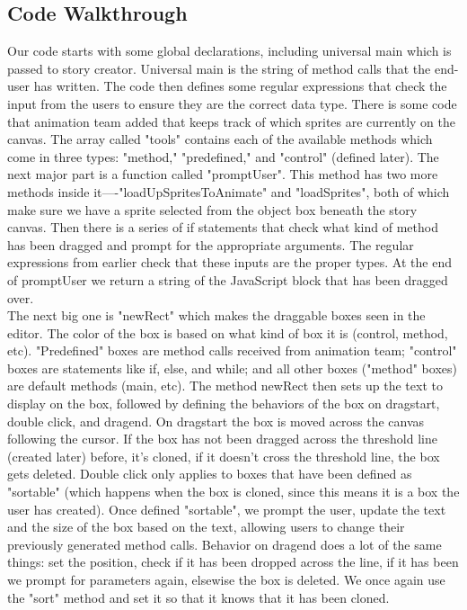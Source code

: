 \documentclass[a4paper]{article}
\begin{document}
\subsection{Code Walkthrough}
Our code starts with some global declarations, including universal main which is passed to story creator. Universal main is the string of method calls that the end-user has written.  The code then defines some regular expressions that check the input from the users to ensure they are the correct data type. There is some code that animation team added that keeps track of which sprites are currently on the canvas. The array called "tools" contains each of the available methods which come in three types: "method," "predefined," and "control" (defined later). The next major part is a function called "promptUser". This method has two more methods inside it—-"loadUpSpritesToAnimate" and "loadSprites", both of which make sure we have a sprite selected from the object box beneath the story canvas. Then there is a series of if statements that check what kind of method has been dragged and prompt for the appropriate arguments. The regular expressions from earlier check that these inputs are the proper types. At the end of promptUser we return a string of the JavaScript block that has been dragged over.\\

The next big one is "newRect" which makes the draggable boxes seen in the editor. The color of the box is based on what kind of box it is (control, method, etc). "Predefined" boxes are method calls received from animation team; "control" boxes are statements like if, else, and while; and all other boxes ("method" boxes) are default methods (main, etc). The method newRect then sets up the text to display on the box, followed by defining the behaviors of the box on dragstart, double click, and dragend. On dragstart the box is moved across the canvas following the cursor. If the box has not been dragged across the threshold line (created later) before, it's cloned, if it doesn't cross the threshold line, the box gets deleted. Double click only applies to boxes that have been defined as "sortable" (which happens when the box is cloned, since this means it is a box the user has created). Once defined "sortable", we prompt the user, update the text and the size of the box based on the text, allowing users to change their previously generated method calls. Behavior on dragend does a lot of the same things: set the position, check if it has been dropped across the line, if it has been we prompt for parameters again, elsewise the box is deleted. We once again use the "sort" method and set it so that it knows that it has been cloned.\\
\end{document}
